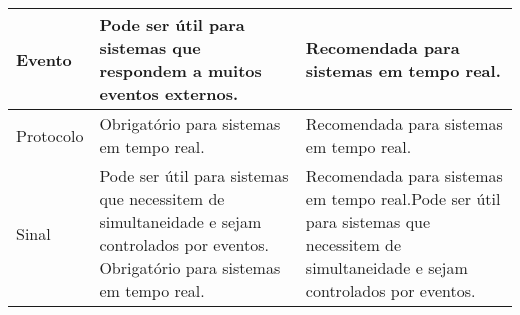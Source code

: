 \begin{longtable}{||p{3cm}|p{5cm}|p{5cm}||}
Evento                                             & Pode ser útil para sistemas que respondem a muitos eventos externos.                                                                                                                                                                                                                                                                                                                                              & Recomendada para sistemas em tempo real.                                                                                                                                                                                                                                                                                                                                         \\ \hline
Protocolo                                          & Obrigatório para sistemas em tempo real.                                                                                                                                                                                                                                                                                                                                                                          & Recomendada para sistemas em tempo real.                                                                                                                                                                                                                                                                                                                                         \\ \hline
Sinal                                              & Pode ser útil para sistemas que necessitem de simultaneidade e sejam controlados por eventos. Obrigatório para sistemas em tempo real.                                                                                                                                                                                                                                                                            & Recomendada para sistemas em tempo real.Pode ser útil para sistemas que necessitem de simultaneidade e sejam controlados por eventos.                                                                                                                                                                                                                                            \\ \hline

\end{longtable}
